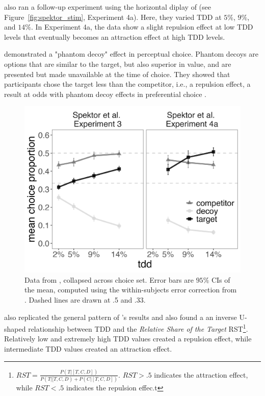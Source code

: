 \textcite{spektorWhenGoodLooks2018b} also ran a follow-up experiment using the horizontal diplay of \textcite{trueblood2013not} (see Figure~\ref{fig:spektor_stim}, Experiment 4a). Here, they varied TDD at $5\%$, $9\%$, and $14\%$. In Experiment 4a, the data show a slight repulsion effect at low TDD levels that eventually becomes an attraction effect at high TDD levels. 

\textcite{truebloodPhantomDecoyEffect2017c} demonstrated a "phantom decoy" effect in perceptual choice. Phantom decoys are options that are similar to the target, but also superior in value, and are presented but made unavailable at the time of choice. They showed that participants chose the target less than the competitor, i.e., a repulsion effect, a result at odds with phantom decoy effects in preferential choice \parencite{pratkanisBriefHistoryResearch1992b,pettiboneExaminingModelsNondominated2000}. 

\begin{figure}
   \includegraphics[width=\linewidth]{figures/spektor_data_collapsed.jpeg}
   \caption{Data from \textcite{spektorWhenGoodLooks2018b}, collapsed across choice set. Error bars are $95\%$ CIs of the mean, computed using the within-subjects error correction from \textcite{morey2008confidence}. Dashed lines are drawn at .5 and .33.}
   \label{fig:spektor_data} %
\end{figure}

\textcite{liaoInfluenceDistanceDecoy2021} also replicated the general pattern of \textcite{spektorWhenGoodLooks2018b}'s results and also found a an inverse U-shaped relationship between TDD and the \textit{Relative Share of the Target} RST\footnote{$RST=\frac{P(T|[T,C,D])}{P(T|[T,C,D)+P(C|[T,C,D])}$. $RST>.5$ indicates the attraction effect, while $RST<.5$ indicates the repulsion effec.t}. Relatively low and extremely high TDD values created a repulsion effect, while intermediate TDD values created an attraction effect. 

